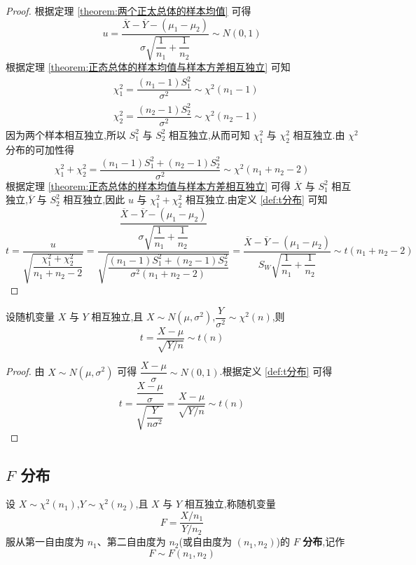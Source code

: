 \begin{proof}
    根据定理 \ref{theorem:两个正太总体的样本均值} 可得
    $$
    u = \dfrac{\overline{X} - \overline{Y} - (\mu_1 - \mu_2)}{\sigma \sqrt{\dfrac{1}{n_1} + \dfrac{1}{n_2}}} \sim N(0,1)
    $$
    根据定理 \ref{theorem:正态总体的样本均值与样本方差相互独立} 可知
    $$
    \begin{aligned}
        & \chi_1^2 = \dfrac{(n_1 - 1) S_1^2}{\sigma^2} \sim \chi^2(n_1 - 1) \\
        & \chi_2^2 = \dfrac{(n_2 - 1) S_2^2}{\sigma^2} \sim \chi^2(n_2 - 1)
    \end{aligned}
    $$
    因为两个样本相互独立,所以 $S_1^2$ 与 $S_2^2$ 相互独立,从而可知 $\chi_1^2$ 与 $\chi_2^2$ 相互独立.由 $\chi^2$ 分布的可加性得
    $$
    \chi_1^2 + \chi_2^2 = \dfrac{(n_1 - 1) S_1^2 + (n_2 - 1) S_2^2}{\sigma^2} \sim \chi^2(n_1 + n_2 - 2)
    $$
    根据定理 \ref{theorem:正态总体的样本均值与样本方差相互独立} 可得 $\overline{X}$ 与 $S_1^2$ 相互独立,$\overline{Y}$ 与 $S_2^2$ 相互独立,因此 $u$ 与 $\chi_1^2 + \chi_2^2$ 相互独立.由定义 \ref{def:t分布} 可知
    $$
    t = \dfrac{u}{\sqrt{\dfrac{\chi_1^2 + \chi_2^2}{n_1 + n_2 - 2}}} = \dfrac{\dfrac{\overline{X} - \overline{Y} - (\mu_1 - \mu_2)}{\sigma \sqrt{\dfrac{1}{n_1} + \dfrac{1}{n_2}}}}{\sqrt{\dfrac{(n_1 - 1) S_1^2 + (n_2 - 1) S_2^2}{\sigma^2 (n_1 + n_2 - 2)}}} = \dfrac{\overline{X} - \overline{Y} - (\mu_1 - \mu_2)}{S_W \sqrt{\dfrac{1}{n_1} + \dfrac{1}{n_2}}} \sim t(n_1 + n_2 - 2)
    $$
\end{proof}

\begin{conclusion}
    设随机变量 $X$ 与 $Y$ 相互独立,且 $X \sim N(\mu, \sigma^2)$,$\dfrac{Y}{\sigma^2} \sim \chi^2(n)$,则
    $$
    t = \dfrac{X - \mu}{\sqrt{Y / n}} \sim t(n)
    $$
\end{conclusion}

\begin{proof}
    由 $X \sim N(\mu, \sigma^2)$ 可得 $\dfrac{X - \mu}{\sigma} \sim N(0,1)$.根据定义 \ref{def:t分布} 可得
    $$
    t = \dfrac{\dfrac{X - \mu}{\sigma}}{\sqrt{\dfrac{Y}{n \sigma^2}}} = \dfrac{X - \mu}{\sqrt{Y / n}} \sim t(n)
    $$
\end{proof}

\subsection{\texorpdfstring{$F$}{} 分布}

\begin{definition} \label{def:F分布}
    设 $X \sim \chi^2(n_1)$,$Y \sim \chi^2(n_2)$,且 $X$ 与 $Y$ 相互独立,称随机变量
    $$
    F = \dfrac{X / n_1}{Y / n_2}
    $$
    服从第一自由度为 $n_1$、第二自由度为 $n_2$(或自由度为 $(n_1,n_2)$)的 $F$ \textbf{分布},记作
    $$
    F \sim F(n_1, n_2)
    $$
\end{definition}

